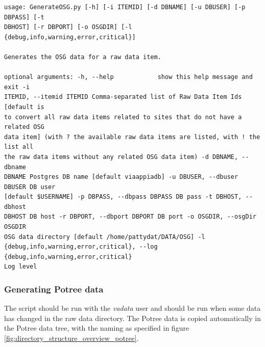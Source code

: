 \begin{Verbatim}[fontfamily=courier,commandchars=\\\{\},fontsize=\footnotesize]
usage: GenerateOSG.py [-h] [-i ITEMID] [-d DBNAME] [-u DBUSER] [-p DBPASS] [-t
DBHOST] [-r DBPORT] [-o OSGDIR] [-l {debug,info,warning,error,critical}]

Generates the OSG data for a raw data item.

optional arguments: -h, --help            show this help message and exit -i
ITEMID, --itemid ITEMID Comma-separated list of Raw Data Item Ids [default is
to convert all raw data items related to sites that do not have a related OSG
data item] (with ? the available raw data items are listed, with ! the list all
the raw data items without any related OSG data item) -d DBNAME, --dbname
DBNAME Postgres DB name [default viaappiadb] -u DBUSER, --dbuser DBUSER DB user
[default $USERNAME] -p DBPASS, --dbpass DBPASS DB pass -t DBHOST, --dbhost
DBHOST DB host -r DBPORT, --dbport DBPORT DB port -o OSGDIR, --osgDir OSGDIR
OSG data directory [default /home/pattydat/DATA/OSG] -l
{debug,info,warning,error,critical}, --log {debug,info,warning,error,critical}
Log level \end{Verbatim}

\subsubsection{Generating Potree data}
\label{sec:generatePotree} 
The script should be run with the \textit{vadata} user and should be run when some data
has changed in the raw data directory. The Potree data is copied automatically
in the Potree data tree, with the naming as specified in figure
\ref{fig:directory_structure_overview_potree}.

